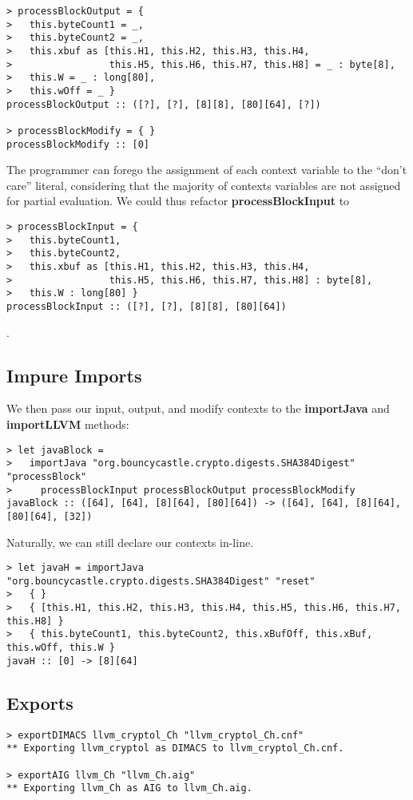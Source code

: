 \documentclass[11pt]{amsart}
\renewcommand{\b}[1]{\textbf{#1}}
\begin{document}
\begin{verbatim}
> processBlockOutput = {
>   this.byteCount1 = _,
>   this.byteCount2 = _,
>   this.xbuf as [this.H1, this.H2, this.H3, this.H4, 
>                 this.H5, this.H6, this.H7, this.H8] = _ : byte[8],
>   this.W = _ : long[80],
>   this.wOff = _ }
processBlockOutput :: ([?], [?], [8][8], [80][64], [?])

> processBlockModify = { }
processBlockModify :: [0]
\end{verbatim}

The programmer can forego the assignment of each context variable to the ``don't care'' literal, considering that the majority of contexts variables are not assigned for partial evaluation.  We could thus refactor \b{processBlockInput} to

\begin{verbatim}
> processBlockInput = {
>   this.byteCount1,
>   this.byteCount2,
>   this.xbuf as [this.H1, this.H2, this.H3, this.H4, 
>                 this.H5, this.H6, this.H7, this.H8] : byte[8],
>   this.W : long[80] }
processBlockInput :: ([?], [?], [8][8], [80][64])
\end{verbatim}.


\clearpage
\subsection*{Impure Imports}
We then pass our input, output, and modify contexts to the \b{importJava} and \b{importLLVM} methods:

\begin{verbatim}
> let javaBlock = 
>   importJava "org.bouncycastle.crypto.digests.SHA384Digest" "processBlock"
>     processBlockInput processBlockOutput processBlockModify
javaBlock :: ([64], [64], [8][64], [80][64]) -> ([64], [64], [8][64], [80][64], [32])
\end{verbatim}

Naturally, we can still declare our contexts in-line.

\begin{verbatim}
> let javaH = importJava "org.bouncycastle.crypto.digests.SHA384Digest" "reset"
>   { }
>   { [this.H1, this.H2, this.H3, this.H4, this.H5, this.H6, this.H7, this.H8] }
>   { this.byteCount1, this.byteCount2, this.xBufOff, this.xBuf, this.wOff, this.W }
javaH :: [0] -> [8][64]
\end{verbatim}


\clearpage
\subsection*{Exports}

\begin{verbatim}
> exportDIMACS llvm_cryptol_Ch "llvm_cryptol_Ch.cnf"
** Exporting llvm_cryptol as DIMACS to llvm_cryptol_Ch.cnf.

> exportAIG llvm_Ch "llvm_Ch.aig"
** Exporting llvm_Ch as AIG to llvm_Ch.aig.
\end{verbatim}
\end{document}
